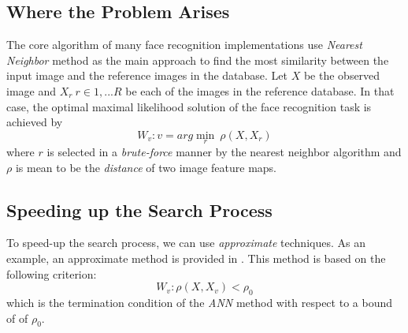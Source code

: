 \subsection{Where the Problem Arises}
The core algorithm of many face recognition implementations use \textit{Nearest Neighbor} method as the main approach to find the most similarity between the input image and the reference images in the database. Let $X$ be the observed image and $X_r \ r\in{1, ... R}$ be each of the images in the reference database. In that case, the optimal maximal likelihood solution of the face recognition task is achieved by
\begin{equation}
	W_v: v = arg\min\limits_{r}\ \rho(X, X_r)
\end{equation}
where $r$ is selected in a \textit{brute-force} manner by the nearest neighbor algorithm and $\rho$ is mean to be the \textit{distance} of two image feature maps.

\subsection{Speeding up the Search Process}
To speed-up the search process, we can use \textit{approximate} techniques. As an example, an approximate method is provided in \cite{def2}. This method is based on the following criterion:
\begin{equation}
	W_v: \rho(X, X_v) < \rho_0
\end{equation}
which is the termination condition of the \textit{ANN} method with respect to a bound of of $\rho_0$.